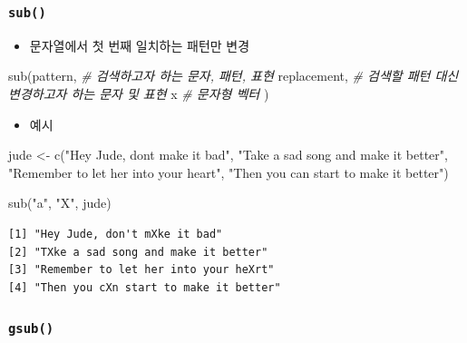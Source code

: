 \documentclass[
  11pt,
]{krantz}
\newenvironment{Shaded}{\begin{snugshade}}{\end{snugshade}}
\newcommand{\CommentTok}[1]{\textcolor[rgb]{0.37,0.37,0.37}{\textit{#1}}}
\newcommand{\FunctionTok}[1]{\textcolor[rgb]{0,0,0}{#1}}
\newcommand{\NormalTok}[1]{#1}
\newcommand{\OtherTok}[1]{\textcolor[rgb]{0.37,0.37,0.37}{#1}}
\newcommand{\StringTok}[1]{\textcolor[rgb]{0.5,0.5,0.5}{#1}}
\providecommand{\tightlist}{%
  \setlength{\itemsep}{0pt}\setlength{\parskip}{0pt}}
\begin{document}
\hypertarget{sub}{%
\subsubsection*{\texorpdfstring{\textbf{\texttt{sub()}}}{sub()}}\label{sub}}


\begin{itemize}
\tightlist
\item
  문자열에서 첫 번째 일치하는 패턴만 변경
\end{itemize}

\footnotesize

\begin{Shaded}
\begin{Highlighting}[]
\FunctionTok{sub}\NormalTok{(pattern, }\CommentTok{\# 검색하고자 하는 문자, 패턴, 표현}
\NormalTok{    replacement, }\CommentTok{\# 검색할 패턴 대신 변경하고자 하는 문자 및 표현}
\NormalTok{    x }\CommentTok{\# 문자형 벡터}
\NormalTok{    )}
\end{Highlighting}
\end{Shaded}

\normalsize

\begin{itemize}
\tightlist
\item
  예시
\end{itemize}

\footnotesize

\begin{Shaded}
\begin{Highlighting}[]
\NormalTok{jude }\OtherTok{\textless{}{-}} \FunctionTok{c}\NormalTok{(}\StringTok{"Hey Jude, don\textquotesingle{}t make it bad"}\NormalTok{, }
         \StringTok{"Take a sad song and make it better"}\NormalTok{, }
         \StringTok{"Remember to let her into your heart"}\NormalTok{, }
         \StringTok{"Then you can start to make it better"}\NormalTok{)}

\FunctionTok{sub}\NormalTok{(}\StringTok{"a"}\NormalTok{, }\StringTok{"X"}\NormalTok{, jude)}
\end{Highlighting}
\end{Shaded}

\begin{verbatim}
[1] "Hey Jude, don't mXke it bad"         
[2] "TXke a sad song and make it better"  
[3] "Remember to let her into your heXrt" 
[4] "Then you cXn start to make it better"
\end{verbatim}

\normalsize

\hypertarget{gsub-fun}{%
\subsubsection*{\texorpdfstring{\textbf{\texttt{gsub()}}}{gsub()}}\label{gsub-fun}}
\end{document}
